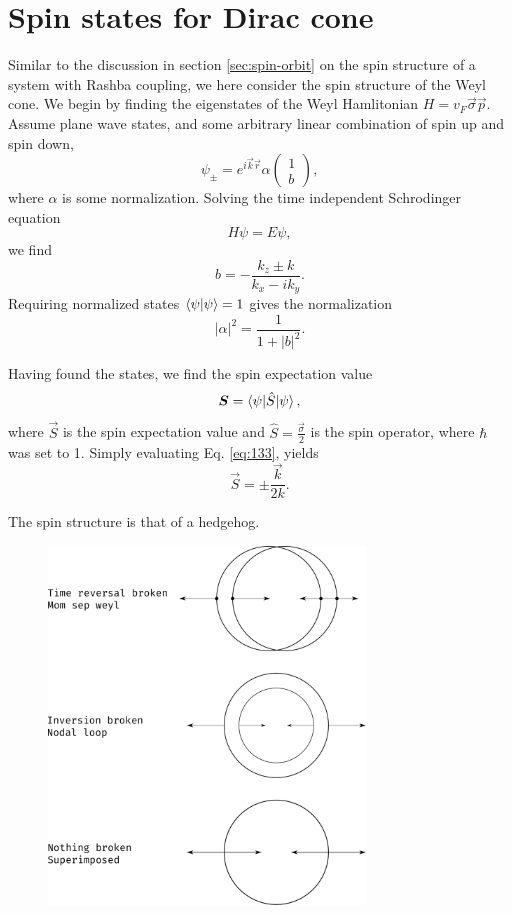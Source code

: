 \chapter{Spin states for Dirac cone}
Similar to the discussion in section \ref{sec:spin-orbit} on the spin structure of a system with Rashba coupling, we here consider the spin structure of the Weyl cone.
We begin by finding the eigenstates of the Weyl Hamlitonian \( H = v_F \vec{\sigma} \vec{p} \).
Assume plane wave states, and some arbitrary linear combination of spin up and spin down,
\[
  \psi _{\pm} = e^{i \vec{k} \vec{r}} \alpha
  \begin{pmatrix}
    1\\
    b
  \end{pmatrix},
\]
where \(\alpha \) is some normalization.
Solving the time independent Schrodinger equation
\[
H \psi = E \psi,
\]
we find
\begin{equation}
  \label{eq:132}
  b = -\frac{k_{z} \pm k}{k_{x} - i k_{y}}.
\end{equation}
Requiring normalized states \(\braket{\psi | \psi } = 1\) gives the normalization
\[
|\alpha |^2 = \frac{1}{1 + |b|^2}.
\]

Having found the states, we find the spin expectation value
\begin{equation}
  \label{eq:133}
  \bm{S} = \braket{\psi | \hat{S} | \psi },
\end{equation}
where \(\vec{S}\) is the spin expectation value and \(\hat{S} = \frac{\vec{\sigma}}{2} \) is the spin operator, where \(\hbar \) was set to 1.
Simply evaluating Eq. \eqref{eq:133}, yields
\begin{equation}
  \label{eq:134}
  \vec{S} = \pm \frac{\vec{k}}{2 k}.
\end{equation}

The spin structure is that of a hedgehog.

\begin{figure}[ht]
  \centering
  \includegraphics[width=0.75\textwidth]{figures/spinStructureWeyl}
  \caption{\label{fig:spinStructure} }
\end{figure}
